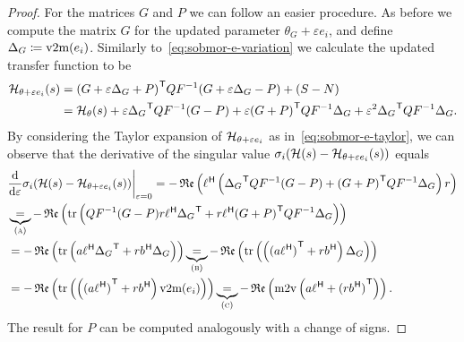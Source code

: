 \begin{proof}
    For the matrices $G$ and $P$ we can follow an easier procedure.
    As before we compute the matrix $G$ for the updated parameter $\theta_G + \varepsilon e_i$, and define $\Delta_G \coloneqq \mathop{}\!\mathrm{v}2\mathrm{m}(e_i)$.
    Similarly to~\eqref{eq:sobmor-e-variation} we calculate the updated transfer function to be
    \begin{equation*}
        \begin{aligned}
            \mathcal{H}_{\theta + \varepsilon e_i}(s) &= {(G + \varepsilon \Delta_G + P)}^{\mkern1mu \mathsf{T}} Q F^{-1} (G + \varepsilon \Delta_G - P) + (S - N) \\
             &= \mathcal{H}_\theta(s) + \varepsilon {\Delta_G}^{\mkern1mu \mathsf{T}} Q F^{-1} (G - P) + \varepsilon {(G + P)}^{\mkern1mu \mathsf{T}} Q F^{-1} \Delta_G + \varepsilon^2 {\Delta_G}^{\mkern1mu \mathsf{T}} Q F^{-1} \Delta_G.
        \end{aligned}
    \end{equation*}
    By considering the Taylor expansion of $\mathcal{H}_{\theta + \varepsilon e_i}$ as in~\eqref{eq:sobmor-e-taylor}, we can observe that the derivative of the singular value $\sigma_i(\mathcal{H}(s) - \mathcal{H}_{\theta + \varepsilon e_i}(s))$ equals
    \begin{equation*}
        \begin{aligned}
            &\res{\frac{\dif}{\dif \varepsilon} \sigma_i(\mcl{H}(s) - \mcl{H}_{\theta + \varepsilon e_i}(s))}{\varepsilon = 0} = - \re{\ell\herm \left( {\Delta_G}\trans Q F\inv (G - P) + {(G + P)}\trans Q F\inv \Delta_G \right) r} \\
             &\underbrace{=}_{(\msc{a})} - \re{\trace{Q F\inv (G - P) r \ell\herm {\Delta_G}\trans + r \ell\herm {(G + P)}\trans Q F\inv \Delta_G}} \\
             &= - \re{\trace{a \ell\herm {\Delta_G}\trans + r b\herm \Delta_G}} \underbrace{=}_{(\msc{b})} - \re{\trace{\left( {(a \ell\herm)}\trans + r b\herm \right) \Delta_G}} \\
             &= -\re{\trace{\left( {(a \ell\herm)}\trans + r b\herm \right) \vecmat(e_i)}} \underbrace{=}_{(\msc{c})} -\re{\matvec\left( a \ell\herm + {(r b\herm)}\trans \right)}.
        \end{aligned}
    \end{equation*}
    The result for $P$ can be computed analogously with a change of signs.


\end{proof}
